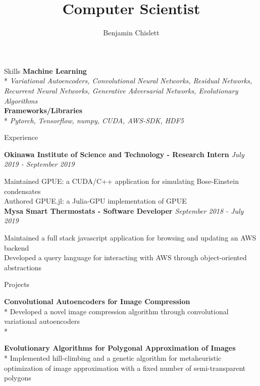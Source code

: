 \documentclass[11pt, letterpaper]{article}
\title{Computer Scientist}
\author{Benjamin Chislett}
\date{}
\begin{document}
\begin{center}
  \Huge\theauthor
  \par
  \huge\thetitle
  \par
\end{center}

\begin{section}{Skills}
\textbf{Machine Learning}\\*
\textit{Variational Autoencoders, Convolutional Neural Networks, Residual Networks, Recurrent Neural Networks, Generative Adversarial Networks, Evolutionary Algorithms}\\

\textbf{Frameworks/Libraries}\\*
\textit{Pytorch, Tensorflow, numpy, CUDA, AWS-SDK, HDF5}
\end{section}

\begin{section}{Experience}

\textbf{Okinawa Institute of Science and Technology - Research Intern}
\hfill
\textit{July 2019 - September 2019}

Maintained GPUE: a CUDA/C++ application for simulating Bose-Einstein condensates\\
Authored GPUE.jl: a Julia-GPU implementation of GPUE\\

\textbf{Mysa Smart Thermostats - Software Developer}
\hfill
\textit{September 2018 - July 2019}

Maintained a full stack javascript application for browsing and updating an AWS backend\\
Developed a query language for interacting with AWS through object-oriented abstractions
\end{section}

\begin{section}{Projects}

\textbf{Convolutional Autoencoders for Image Compression}\\*
Developed a novel image compression algorithm through convolutional variational autoencoders\\*

\textbf{Evolutionary Algorithms for Polygonal Approximation of Images}\\*
Implemented hill-climbing and a genetic algorithm for metaheuristic optimization of image approximation with a fixed number of semi-transparent polygons
\end{section}
\end{document}

